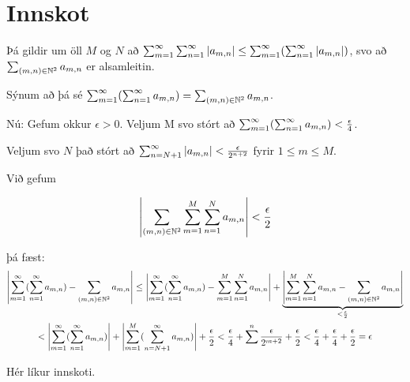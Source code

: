 \documentclass[12pt]{book}
\begin{document}
\section*{Innskot}

{

\def\mn{(m,n)}
\def\amn{a_{m,n}}
\def\summn{\sum_{\mn \in \N^2}}

Þá gildir um öll $M$ og $N$ að $\sum_{m=1}^{\infty} \sum_{n=1}^{\infty} \abs{\amn} \leq \summinfty (\sumoinfty \abs{\amn})$, svo að $\sum_{\mn \in \N^2} \amn$ er alsamleitin.

Sýnum að þá sé $\summinfty ( \sumoinfty \amn ) = \summn \amn$.

Nú: Gefum okkur $\epsilon > 0$. Veljum M svo stórt að $\summinfty ( \sumoinfty \amn ) < \eps{4}$.

Veljum svo $N$ það stórt að $\sum_{n = N+1}^{\infty} \abs{\amn} < \eps{2^{n+2}}$ fyrir $1 \leq m \leq M$.


Við gefum 

\[\abs{\sum_{(m,n) \in \N^2} \sum_{m=1}^M \sum_{n=1}^N \amn } < \eps{2} \]

þá fæst: 
\begin{gather*}
\abs{\summinfty ( \sumoinfty \amn) - \sum_{(m,n) \in \N^2} \amn}  \leq \abs{\summinfty ( \sumoinfty \amn) - \sum_{m=1}^{M} \sum_{n=1}^N \amn} + \underbrace{\abs{\sum_{m=1}^M \sum_{n=1}^N \amn - \sum_{(m,n) \in \N^2} \amn}}_{< \eps{2}}\\
< \abs{\summinfty ( \sumoinfty \amn)} + \abs{\sum_{m=1}^M ( \sum_{n = N+1}^{\infty} \amn)} + \eps{2} < \eps{4} + \sum^n \eps{2^{m+2}} + \eps{2} < \eps{4} + \eps{4} + \eps{2} = \epsilon
\end{gather*}

Hér líkur innskoti.

}

\section{}
\end{document}
